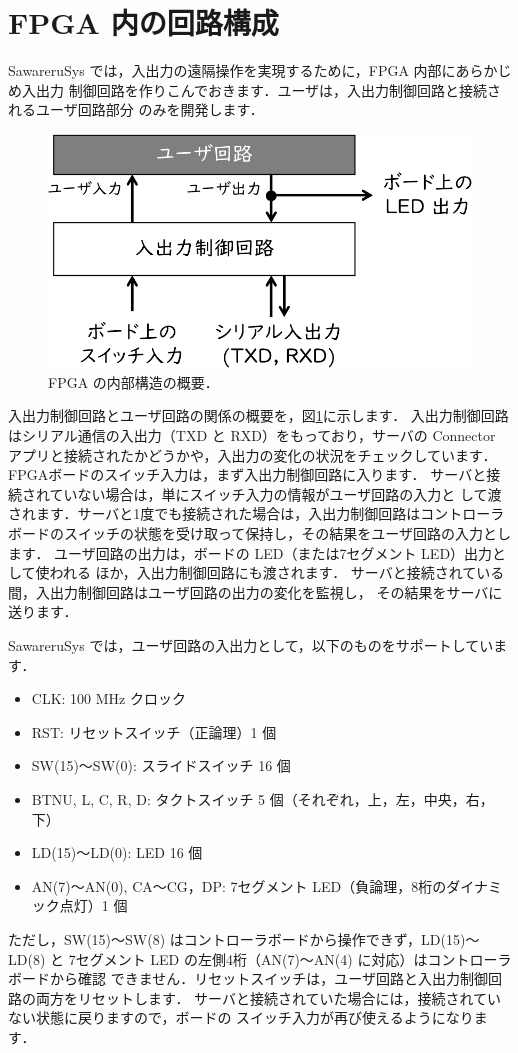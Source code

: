 \section{FPGA 内の回路構成}

SawareruSys では，入出力の遠隔操作を実現するために，FPGA 内部にあらかじめ入出力
制御回路を作りこんでおきます．ユーザは，入出力制御回路と接続されるユーザ回路部分
のみを開発します．

\begin{figure}[ht]
 \centering
 \includegraphics[width=80truemm]{figs/iocircuit.pdf}
 \caption{FPGA の内部構造の概要．}
 \label{fig:iocircuit}
\end{figure}

入出力制御回路とユーザ回路の関係の概要を，図\ref{fig:iocircuit}に示します．
入出力制御回路はシリアル通信の入出力（TXD と RXD）をもっており，サーバの
Connector アプリと接続されたかどうかや，入出力の変化の状況をチェックしています．
FPGAボードのスイッチ入力は，まず入出力制御回路に入ります．
サーバと接続されていない場合は，単にスイッチ入力の情報がユーザ回路の入力と
して渡されます．サーバと1度でも接続された場合は，入出力制御回路はコントローラ
ボードのスイッチの状態を受け取って保持し，その結果をユーザ回路の入力とします．
ユーザ回路の出力は，ボードの LED（または7セグメント LED）出力として使われる
ほか，入出力制御回路にも渡されます．
サーバと接続されている間，入出力制御回路はユーザ回路の出力の変化を監視し，
その結果をサーバに送ります．

SawareruSys では，ユーザ回路の入出力として，以下のものをサポートしています．
\begin{itemize}
 \item CLK: 100 MHz クロック 
 \item RST: リセットスイッチ（正論理）1 個
 \item SW(15)～SW(0): スライドスイッチ 16 個
 \item BTN{U, L, C, R, D}: タクトスイッチ 5 個（それぞれ，上，左，中央，右，下）
 \item LD(15)～LD(0): LED 16 個
 \item AN(7)～AN(0), CA～CG，DP: 7セグメント LED（負論理，8桁のダイナミック点灯）1 個
\end{itemize}
ただし，SW(15)～SW(8) はコントローラボードから操作できず，LD(15)～LD(8) と
7セグメント LED の左側4桁（AN(7)～AN(4) に対応）はコントローラボードから確認
できません．リセットスイッチは，ユーザ回路と入出力制御回路の両方をリセットします．
サーバと接続されていた場合には，接続されていない状態に戻りますので，ボードの
スイッチ入力が再び使えるようになります．

